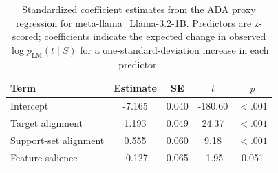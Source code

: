 \begin{table}

\caption{\label{tab:ada-coefficients-meta-llama-llama-3-2-1b}Standardized coefficient estimates from the ADA proxy regression for meta-llama_Llama-3.2-1B. Predictors are z-scored; coefficients indicate the expected change in observed $\log p_{\mathrm{LM}}(t \mid S)$ for a one-standard-deviation increase in each predictor.}
\centering
\begin{tabular}[t]{lcccc}
\toprule
Term & Estimate & SE & $t$ & $p$\\
\midrule
Intercept & -7.165 & 0.040 & -180.60 & $< .001$\\
Target alignment & 1.193 & 0.049 & 24.37 & $< .001$\\
Support-set alignment & 0.555 & 0.060 & 9.18 & $< .001$\\
Feature salience & -0.127 & 0.065 & -1.95 & 0.051\\
\bottomrule
\end{tabular}
\end{table}
